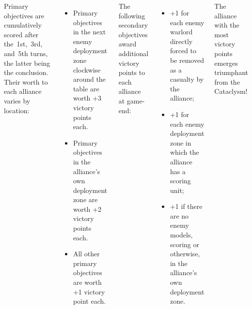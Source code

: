 \documentclass{40k}
\begin{document}
\begin{columns}



%

Primary objectives are cumulatively scored after
the~1st,~3rd, and~5th turns, the latter being the conclusion.  Their
worth to each alliance varies by location:

\begin{itemize}
\item Primary objectives in the next enemy deployment zone clockwise
  around the table are worth +3 victory points each.

\item Primary objectives in the alliance's own deployment zone are
  worth +2 victory points each.

\item All other primary objectives are worth +1 victory point each.
\end{itemize}

The following secondary objectives award additional victory points to
each alliance at game-end:
\begin{itemize}
\item +1 for each enemy warlord directly forced to be removed as a
  casualty by the alliance;

\item +1 for each enemy deployment zone in which the alliance has a
  scoring unit;

\item +1 if there are no enemy models, scoring or otherwise, in the
  alliance's own deployment zone.
\end{itemize}

The alliance with the most victory points emerges triumphant
from the Cataclysm!


\end{columns}
\end{document}
